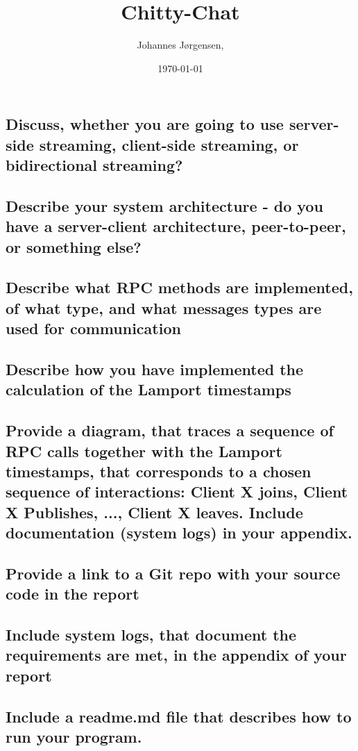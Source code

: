 \documentclass[a4paper,11pt]{article}
\title{Chitty-Chat}
\author{Johannes Jørgensen,}
\date{\today}
\begin{document}
 

\maketitle

\subsection*{Discuss, whether you are going to use server-side streaming, client-side streaming, or bidirectional streaming?}
\subsection*{Describe your system architecture - do you have a server-client architecture, peer-to-peer, or something else?}
\subsection*{Describe what  RPC methods are implemented, of what type, and what messages types are used for communication}
\subsection*{Describe how you have implemented the calculation of the Lamport timestamps}
\subsection*{Provide a diagram, that traces a sequence of RPC calls together with the Lamport timestamps, that corresponds to a chosen sequence of interactions: Client X joins, Client X Publishes, ..., Client X leaves. Include documentation (system logs) in your appendix.}
\subsection*{Provide a link to a Git repo with your source code in the report}
\subsection*{Include system logs, that document the requirements are met, in the appendix of your report}
\subsection*{Include a readme.md file that describes how to run your program.}
\end{document}
